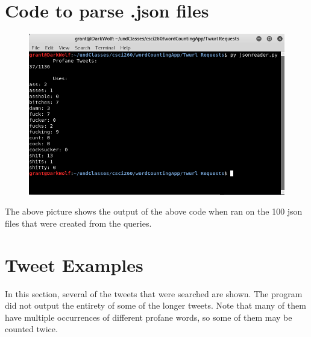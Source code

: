 \documentclass{article}
\begin{document}
\section{Code to parse .json files}


\begin{figure}[h]
	\includegraphics[scale=2.59]{terminal}
\end{figure}

The above picture shows the output of the above code when ran on the 100 json files that were created from the queries.

\section{Tweet Examples}
\tab In this section, several of the tweets that were searched are shown. The program did not output the entirety of some of the longer tweets. Note that many of them have multiple occurrences of different profane words, so some of them may be counted twice.\newline
\end{document}
